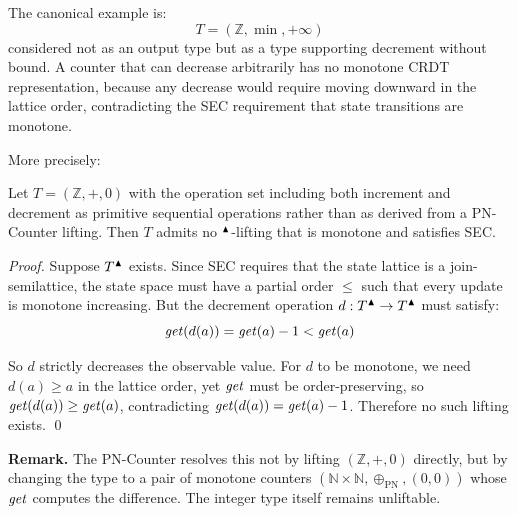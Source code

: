 The canonical example is:
\[
T = (\mathbb{Z}, \min, +\infty)
\]
considered not as an output type but as a type supporting decrement without bound. A counter that can decrease arbitrarily has no monotone CRDT representation, because any decrease would require moving downward in the lattice order, contradicting the SEC requirement that state transitions are monotone.

More precisely:

\begin{theorem}
Let $T = (\mathbb{Z}, +, 0)$ with the operation set including both increment and decrement as primitive sequential operations rather than as derived from a PN-Counter lifting. Then $T$ admits no ${}^{\blacktriangle}{}$-lifting that is monotone and satisfies SEC.
\end{theorem}

\begin{proof}
Suppose $T{}^{\blacktriangle}{}$ exists. Since SEC requires that the state lattice is a join-semilattice, the state space must have a partial order $\leq$ such that every update is monotone increasing. But the decrement operation $d : T{}^{\blacktriangle}{} \to T{}^{\blacktriangle}{}$ must satisfy:
\[
\mathit{get}(d(a)) = \mathit{get}(a) - 1 < \mathit{get}(a)
\]

So $d$ strictly decreases the observable value. For $d$ to be monotone, we need $d(a) \geq a$ in the lattice order, yet $\mathit{get}$ must be order-preserving, so $\mathit{get}(d(a)) \geq \mathit{get}(a)$, contradicting $\mathit{get}(d(a)) = \mathit{get}(a) - 1$. Therefore no such lifting exists. \qed
\end{proof}

\medskip
\noindent\textbf{Remark.} The PN-Counter resolves this not by lifting $(\mathbb{Z}, +, 0)$ directly, but by changing the type to a pair of monotone counters $(\mathbb{N} \times \mathbb{N}, \oplus_{\text{PN}}, (0,0))$ whose $\mathit{get}$ computes the difference. The integer type itself remains unliftable.

